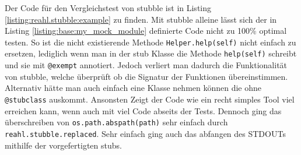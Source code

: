 Der Code für den Vergleichstest von stubble ist in Listing \ref{listing:reahl.stubble:example} zu finden.
Mit stubble alleine lässt sich der in Listing \ref{listing:base:my_mock_module} definierte Code nicht
zu 100\% optimal testen. So ist die nicht existierende Methode \lstinline{Helper.help(self)} nicht einfach
zu ersetzen, lediglich wenn man in der \Gls{stub} Klasse die Methode \lstinline{help(self)} schreibt und
sie mit \lstinline{@exempt} annotiert. Jedoch verliert man dadurch die Funktionalität von stubble, welche
überprüft ob die Signatur der Funktionen übereinstimmen. Alternativ hätte man auch einfach eine Klasse
nehmen können die ohne \lstinline{@stubclass} auskommt. Ansonsten Zeigt der Code wie ein recht simples
Tool viel erreichen kann, wenn auch mit viel Code abseits der Tests. Dennoch ging das überschreiben von
\lstinline{os.path.abspath(path)} sehr einfach durch \lstinline{reahl.stubble.replaced}. Sehr einfach
ging auch das abfangen des STDOUTs mithilfe der vorgefertigten \Glspl{stub}.